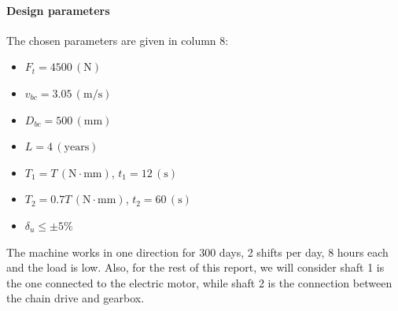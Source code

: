 \documentclass[12pt,a5paper,graybox,envcountchap,sectrefs]{svmono}
\newcommand{\unit}[1]{\ensuremath{\, \mathrm{#1}}}
\begin{document}
		\paragraph{Design parameters} The chosen parameters are given in column 8:
		\begin{itemize}
			\item $ F_t = 4500 \unit{(N)} $
			\item $ v_{bc} = 3.05 \unit{(m/s)} $
			\item $ D_{bc} = 500 \unit{(mm)} $
			\item $ L = 4 \unit{(years)} $
			\item $ T_1 = T \unit{(N\cdot mm)}$, $ t_1 = 12 \unit{(s)} $
			\item $ T_2 = 0.7T \unit{(N\cdot mm)}$, $ t_2 = 60 \unit{(s)} $
			\item $ \delta_u \leq \pm 5\% $
		\end{itemize}
		The machine works in one direction for 300 days, 2 shifts per day, 8 hours each and the load is low. Also, for the rest of this report, we will consider shaft 1 is the one connected to the electric motor, while shaft 2 is the connection between the chain drive and gearbox.
	
	
	
	
	
\end{document}
